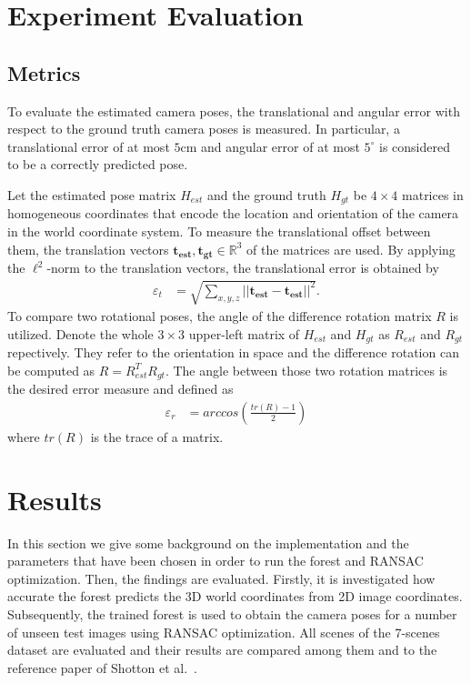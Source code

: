 \documentclass[final]{cvpr}
\begin{document}
\section{Experiment Evaluation}


\subsection{Metrics} \label{subsec:metrics}
To evaluate the estimated camera poses, the translational and angular error with respect to the 
ground truth camera poses is measured. In particular, a translational error of at 
most $5$cm and angular error of at most $5^{\circ}$ is considered to be a correctly predicted pose. 

Let the estimated pose matrix $H_{est}$ and the ground truth $H_{gt}$ be $4 \times 4$ matrices
in homogeneous coordinates that encode the location and orientation of the camera in the world 
coordinate system. To measure the translational offset between them, the translation vectors 
$\boldsymbol{t_{est}}, \boldsymbol{t_{gt}} \in \mathbb{R}^3$ of the matrices are used.
By applying the $\ell^2$-norm to the translation vectors, the translational error is obtained by
\begin{align}
    \varepsilon_t &= \sqrt{\sum_{x,y,z}||\boldsymbol{t_{est}} - \boldsymbol{t_{est}}||^2}.
\end{align}
To compare two rotational poses, the angle of the difference rotation matrix $R$ is utilized. 
Denote the whole $3\times3$ upper-left matrix of $H_{est}$ and $H_{gt}$ as $R_{est}$ and 
$R_{gt}$ repectively. They refer to the orientation in space and the difference rotation can be computed 
as $R = R_{est}^TR_{gt}$. The angle between those two rotation matrices is the desired
error measure and defined as
\begin{align}
    \varepsilon_r &= arccos \left( \frac{tr(R)-1}{2} \right)
\end{align}
where $tr(R)$ is the trace of a matrix.


\section{Results}
In this section we give some background on the implementation and the parameters that have been chosen in order to 
run the forest and RANSAC optimization. Then, the findings are evaluated. Firstly, it is investigated how accurate the 
forest predicts the 3D world coordinates from 2D image coordinates. Subsequently, the trained forest is used to obtain 
the camera poses for a number of unseen test images using RANSAC optimization. All scenes of the 7-scenes dataset 
are evaluated and their results are compared among them and to the reference paper of Shotton et al.~\cite{shotton2013}. 
\end{document}
